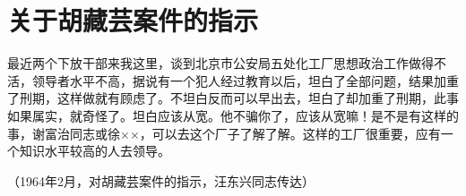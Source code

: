 \section[关于胡藏芸案件的指示（一九六四年二月）]{关于胡藏芸案件的指示}


最近两个下放干部来我这里，谈到北京市公安局五处化工厂思想政治工作做得不活，领导者水平不高，据说有一个犯人经过教育以后，坦白了全部问题，结果加重了刑期，这样做就有顾虑了。不坦白反而可以早出去，坦白了却加重了刑期，此事如果属实，就奇怪了。坦白应该从宽。他不骗你了，应该从宽嘛！是不是有这样的事，谢富治同志或徐××，可以去这个厂子了解了解。这样的工厂很重要，应有一个知识水平较高的人去领导。

{\raggedleft （1964年2月，对胡藏芸案件的指示，汪东兴同志传达）\par}


